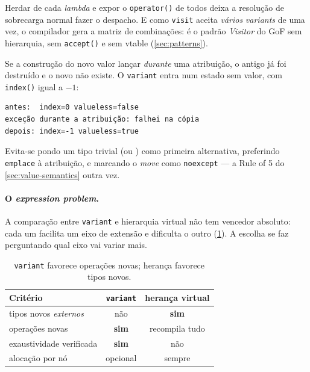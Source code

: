 Herdar de cada \emph{lambda} e expor o \texttt{operator()} de todos deixa a
resolução de sobrecarga normal fazer o despacho. E como \texttt{visit} aceita
\emph{vários} \emph{variants} de uma vez, o compilador gera a matriz de
combinações: é o padrão \emph{Visitor} do GoF sem hierarquia, sem
\texttt{accept()} e sem \gls{vtable} (\cref{sec:patterns}).

\begin{armadilha}
Se a construção do novo valor lançar \emph{durante} uma atribuição, o antigo já
foi destruído e o novo não existe. O \texttt{variant} entra num estado sem
valor, com \texttt{index()} igual a $-1$:
\begin{lstlisting}[style=bt, language=bash, frame=none,
                   xleftmargin=0pt, xrightmargin=0pt]
antes:  index=0 valueless=false
exceção durante a atribuição: falhei na cópia
depois: index=-1 valueless=true
\end{lstlisting}
Evita-se pondo um tipo trivial (ou ) como primeira
alternativa, preferindo \texttt{emplace} à atribuição, e marcando o \emph{move}
como \texttt{noexcept} --- a Rule of 5 do \cref{sec:value-semantics} outra vez.
\end{armadilha}

\paragraph{O \emph{expression problem}.} A comparação entre \texttt{variant} e
hierarquia virtual não tem vencedor absoluto: cada um facilita um eixo de
extensão e dificulta o outro (\cref{tab:variant-heranca}). A escolha se faz
perguntando qual eixo vai variar mais.

\begin{table}[htbp]
\centering
\caption{\texttt{variant} favorece operações novas; herança favorece tipos novos.}
\label{tab:variant-heranca}
\footnotesize
\begin{tabular}{@{}lcc@{}}
\toprule
\textbf{Critério} & \texttt{variant} & \textbf{herança virtual} \\
\midrule
tipos novos \emph{externos}      & não          & \textbf{sim} \\
operações novas                  & \textbf{sim} & recompila tudo \\
exaustividade verificada         & \textbf{sim} & não \\
alocação por nó                  & opcional     & sempre \\
\bottomrule
\end{tabular}
\end{table}

